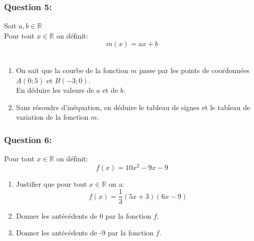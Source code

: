\documentclass[t,12pt]{beamer}
\newcommand{\R}{\mathbb{R}}
\begin{document}
\begin{frame}
	\frametitle{Question 5: }
		Soit $a,b \in \R$ \\
		Pour tout  $x\in\R$ on définit: $$m(x) = ax + b $$ \hfill\\[-0.2cm]
	\begin{enumerate}
		\item On sait que la courbe de la fonction $m$ passe par les points de coordonnées $A(0;5)$ et $B(-3;0)$. \\[0.2cm] En déduire les valeurs de $a$ et de $b$.\\ 
		\item Sans résoudre d'inéquation, en déduire le tableau de signes et le tableau de variation de la fonction $m$. 
		
	\end{enumerate}
	
 

\end{frame}

\begin{frame}
	\frametitle{Question 6: }
	Pour tout  $x\in\R$ on définit: $$f(x)= 10x^2-9x-9 $$ 
\begin{enumerate}
	\item Justifier que pour tout $x\in\R$ on a: $$f(x)= \dfrac{1}{3}(5x+3)(6x-9)$$ 
	\item Donner les antécédents de 0 par la fonction $f$. 
	\item Donner les antécédents de -9 par la fonction $f$. 
\end{enumerate}
	
\end{frame}
\end{document}

